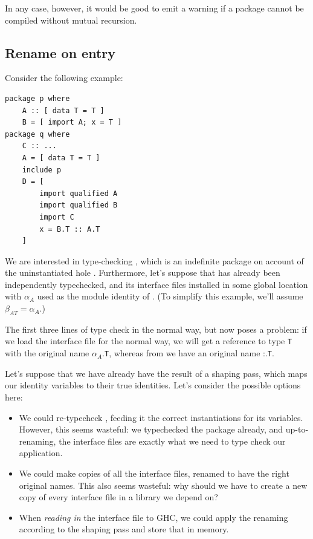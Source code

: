 \documentclass{article}
\begin{document}
In any case, however, it would be good to emit a warning if a package
cannot be compiled without mutual recursion.

\subsection{Rename on entry}

Consider the following example:

\begin{verbatim}
package p where
    A :: [ data T = T ]
    B = [ import A; x = T ]
package q where
    C :: ...
    A = [ data T = T ]
    include p
    D = [
        import qualified A
        import qualified B
        import C
        x = B.T :: A.T
    ]
\end{verbatim}

We are interested in type-checking , which is an indefinite package
on account of the uninstantiated hole .  Furthermore, let's suppose that
 has already been independently typechecked, and its interface files
installed in some global location with $\alpha_A$ used as the module identity
of . (To simplify this example, we'll assume $\beta_{AT}=\alpha_A$.)

The first three lines of  type check in the normal way, but 
now poses a problem: if we load the interface file for  the normal way,
we will get a reference to type \texttt{T} with the original name $\alpha_A$.\texttt{T},
whereas from  we have an original name :.\texttt{T}.

Let's suppose that we have already have the result of a shaping pass, which
maps our identity variables to their true identities.
Let's consider the possible options here:

\begin{itemize}
    \item We could re-typecheck , feeding it the correct instantiations
        for its variables.  However, this seems wasteful: we typechecked the
        package already, and up-to-renaming, the interface files are exactly
        what we need to type check our application.
    \item We could make copies of all the interface files, renamed to have the
        right original names.  This also seems wasteful: why should we have to
        create a new copy of every interface file in a library we depend on?
    \item When \emph{reading in} the interface file to GHC, we could apply the
        renaming according to the shaping pass and store that in memory.
\end{itemize}
\end{document}
